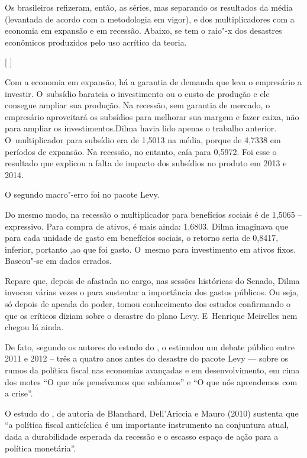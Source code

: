 Os brasileiros refizeram, então, as séries, mas separando os resultados
da média (levantada de acordo com a metodologia em vigor), e dos
multiplicadores com a economia em expansão e em recessão. Abaixo, se tem
o raio"-x dos desastres econômicos produzidos pelo uso acrítico da
teoria.

[  ]

Com a economia em expansão, há a garantia de demanda que leva o
empresário a investir. O~subsídio barateia o investimento ou o custo de
produção e ele consegue ampliar sua produção. Na recessão, sem garantia
de mercado, o empresário aproveitará os subsídios para melhorar sua
margem e fazer caixa, não para ampliar os investimentos.Dilma havia lido
apenas o trabalho anterior. O~multiplicador para subsídio era de 1,5013
na média, porque de 4,7338 em períodos de expansão. Na recessão, no
entanto, caía para 0,5972. Foi esse o resultado que explicou a falta de
impacto dos subsídios no produto em 2013 e 2014.

O segundo macro"-erro foi no pacote Levy.

Do mesmo modo, na recessão o multiplicador para benefícios sociais é de
1,5065 -- expressivo. Para compra de ativos, é mais ainda: 1,6803. Dilma
imaginava que para cada unidade de gasto em benefícios sociais, o
retorno seria de 0,8417, inferior, portanto ,ao que foi gasto. O~mesmo
para investimento em ativos fixos. Baseou"-se em dados errados.

Repare que, depois de afastada no cargo, nas sessões históricas do
Senado, Dilma invocou várias vezes o  para sustentar a importância
dos gastos públicos. Ou seja, só depois de apeada do poder, tomou
conhecimento dos estudos confirmando o que os críticos diziam sobre o
desastre do plano Levy. E~Henrique Meirelles nem chegou lá ainda.

De fato, segundo os autores do estudo do , o  estimulou um debate
público entre 2011 e 2012 -- três a quatro anos antes do desastre do
pacote Levy --- sobre os rumos da política fiscal nas economias
avançadas e em desenvolvimento, em cima dos motes ``O que nós pensávamos
que sabíamos'' e ``O que nós aprendemos com a crise''.

O estudo do , de autoria de Blanchard, Dell'Ariccia e Mauro (2010)
sustenta que ``a política fiscal anticíclica é um importante instrumento
na conjuntura atual, dada a durabilidade esperada da recessão e o
escasso espaço de ação para a política monetária''.

